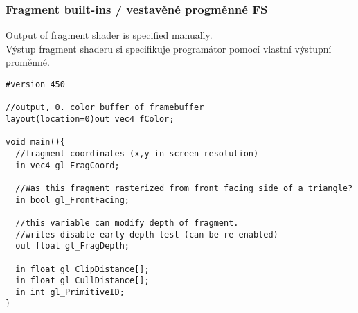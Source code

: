 \begin{frame}[fragile]
\frametitle{Fragment built-ins / vestavěné progměnné FS}
Output of fragment shader is specified manually.\\
Výstup fragment shaderu si specifikuje programátor pomocí vlastní výstupní proměnné.
{\scriptsize
\begin{verbatim}
#version 450

//output, 0. color buffer of framebuffer
layout(location=0)out vec4 fColor;

void main(){
  //fragment coordinates (x,y in screen resolution)
  in vec4 gl_FragCoord;

  //Was this fragment rasterized from front facing side of a triangle?
  in bool gl_FrontFacing;

  //this variable can modify depth of fragment.
  //writes disable early depth test (can be re-enabled)
  out float gl_FragDepth;

  in float gl_ClipDistance[];
  in float gl_CullDistance[];
  in int gl_PrimitiveID;
}

\end{verbatim}
}
\end{frame}

